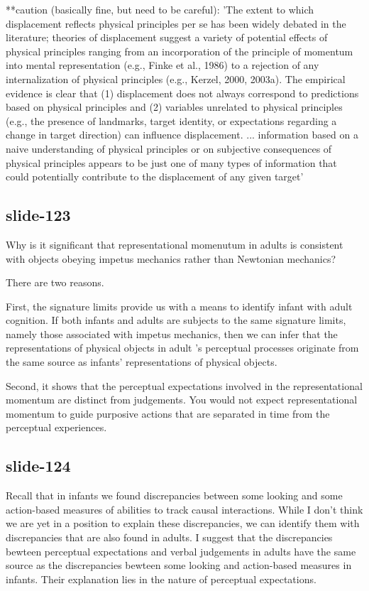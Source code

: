 \documentclass[12pt,\papersize]{extarticle}
\begin{document}
**caution (basically fine, but need to be careful): 'The extent to which displacement reflects physical principles per se has been widely debated in the literature; theories of displacement suggest a variety of potential effects of physical principles ranging from an incorporation of the principle of momentum into mental representation (e.g., Finke et al., 1986) to a rejection of any internalization of physical principles (e.g., Kerzel, 2000, 2003a). The empirical evidence is clear that (1) displacement does not always correspond to predictions based on physical principles and (2) variables unrelated to physical principles (e.g., the presence of landmarks, target identity, or expectations regarding a change in target direction) can influence displacement. ... information based on a naive understanding of physical principles or on subjective consequences of physical principles appears to be just one of many types of information that could potentially contribute to the displacement of any given target' \citep[p.\ 842]{hubbard:2005_representational}
 
\subsection{slide-123}
Why is it significant that representational momenutum in adults is consistent with
objects obeying impetus mechanics rather than Newtonian mechanics?
 
There are two reasons.
 
First, the signature limits provide us with a means to identify infant with adult cognition.
If both infants and adults are subjects to the same signature limits, namely those associated
with impetus mechanics, then we can infer that the representations of physical objects in 
adult 's perceptual processes originate from the same source as infants' representations of 
physical objects.
 
Second, it shows that the perceptual expectations involved in the representational momentum
are distinct from judgements.  You would not expect representational momentum to guide 
purposive actions that are separated in time from the perceptual experiences.
 
\subsection{slide-124}
Recall that in infants we found discrepancies between some looking and some action-based 
measures of abilities to track causal interactions.
While I don't think we are yet in a position to explain these discrepancies, we can identify 
them with discrepancies that are also found in adults.
I suggest that
the discrepancies bewteen perceptual expectations and verbal judgements in adults have the same
source
as the discrepancies bewteen some looking and action-based measures in infants.
Their explanation lies in the nature of perceptual expectations.
 
\end{document}
